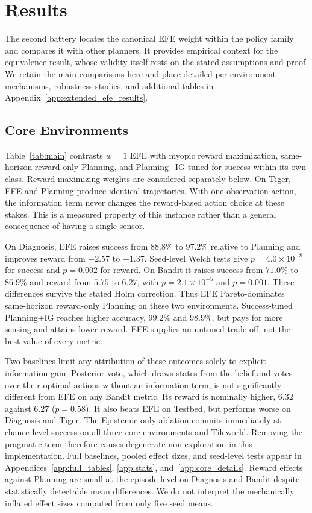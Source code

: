 \section{Results}
\label{sec:results}

The second battery locates the canonical EFE weight within the policy family and compares it with other planners. It provides empirical context for the equivalence result, whose validity itself rests on the stated assumptions and proof. We retain the main comparisons here and place detailed per-environment mechanisms, robustness studies, and additional tables in Appendix~\ref{app:extended_efe_results}.

\subsection{Core Environments}

Table~\ref{tab:main} contrasts $w{=}1$ EFE with myopic reward maximization, same-horizon reward-only Planning, and Planning+IG tuned for success within its own class. Reward-maximizing weights are considered separately below. On Tiger, EFE and Planning produce identical trajectories. With one observation action, the information term never changes the reward-based action choice at these stakes. This is a measured property of this instance rather than a general consequence of having a single sensor.


On Diagnosis, EFE raises success from $88.8\%$ to $97.2\%$ relative to Planning and improves reward from $-2.57$ to $-1.37$. Seed-level Welch tests give $p=4.0{\times}10^{-8}$ for success and $p=0.002$ for reward. On Bandit it raises success from $71.0\%$ to $86.9\%$ and reward from $5.75$ to $6.27$, with $p=2.1{\times}10^{-5}$ and $p=0.001$. These differences survive the stated Holm correction. Thus EFE Pareto-dominates same-horizon reward-only Planning on these two environments. Success-tuned Planning+IG reaches higher accuracy, $99.2\%$ and $98.9\%$, but pays for more sensing and attains lower reward. EFE supplies an untuned trade-off, not the best value of every metric.

Two baselines limit any attribution of these outcomes solely to explicit information gain. Posterior-vote, which draws states from the belief and votes over their optimal actions without an information term, is not significantly different from EFE on any Bandit metric. Its reward is nominally higher, $6.32$ against $6.27$ ($p=0.58$). It also beats EFE on Testbed, but performs worse on Diagnosis and Tiger. The Epistemic-only ablation commits immediately at chance-level success on all three core environments and Tileworld. Removing the pragmatic term therefore causes degenerate non-exploration in this implementation. Full baselines, pooled effect sizes, and seed-level tests appear in Appendices~\ref{app:full_tables}, \ref{app:stats}, and~\ref{app:core_details}. Reward effects against Planning are small at the episode level on Diagnosis and Bandit despite statistically detectable mean differences. We do not interpret the mechanically inflated effect sizes computed from only five seed means.

